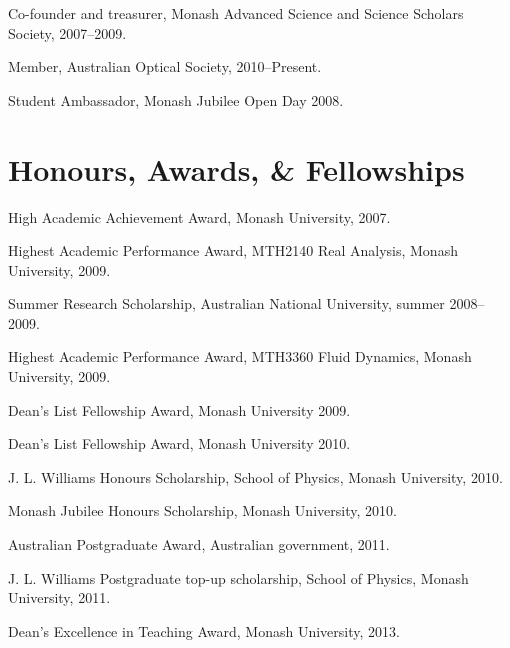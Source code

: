 \documentclass[10pt,a4paper]{article}
\renewenvironment{itemize}{
  \begin{list}{}{
    \setlength{\leftmargin}{1.5em}
    \setlength{\itemsep}{0.25em}
    \setlength{\parskip}{0pt}
    \setlength{\parsep}{0.25em}
  }
}{
  \end{list}
}
\begin{document}
\begin{itemize}
\item Co-founder and treasurer, Monash Advanced Science and Science Scholars Society, 2007--2009.
\item Member, Australian Optical Society, 2010--Present.
\item Student Ambassador, Monash Jubilee Open Day 2008.
\end{itemize}

\section*{Honours, Awards, \& Fellowships}

\begin{itemize}
\item High Academic Achievement Award, Monash University, 2007.
\item Highest Academic Performance Award, MTH2140 Real Analysis, Monash University, 2009.
\item Summer Research Scholarship, Australian National University, summer 2008--2009.
\item Highest Academic Performance Award, MTH3360 Fluid Dynamics, Monash University, 2009.
\item Dean's List Fellowship Award, Monash University 2009.
\item Dean's List Fellowship Award, Monash University 2010.
\item J. L. Williams Honours Scholarship, School of Physics, Monash University, 2010.
\item Monash Jubilee Honours Scholarship, Monash University, 2010.
\item Australian Postgraduate Award, Australian government, 2011.
\item J. L. Williams Postgraduate top-up scholarship, School of Physics, Monash University, 2011.
\item Dean's Excellence in Teaching Award, Monash University, 2013.
\end{itemize}
\end{document}
